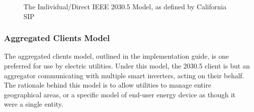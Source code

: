 \begin{figure}[H]
    \begin{center}
        \caption{The Individual/Direct IEEE 2030.5 Model, as defined by California SIP}
    \end{center}
\end{figure}


\subsubsection{Aggregated Clients Model}
The aggregated clients model, outlined in the implementation guide, is one preferred for use by electric utilities. Under this model, the 2030.5 client is but an aggregator communicating with multiple smart inverters, acting on their behalf.
The rationale behind this model is to allow utilities to manage entire geographical areas, or a specific model of end-user energy device as though it were a single entity.



